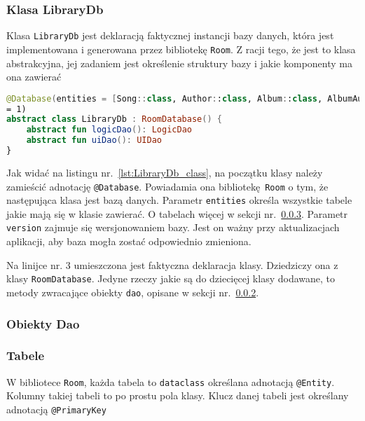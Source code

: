 \subsubsection{Klasa LibraryDb} \label{sec:LibraryDb}

Klasa \texttt{LibraryDb} jest deklaracją faktycznej instancji bazy danych, która jest implementowana i generowana przez bibliotekę \texttt{Room}. Z racji tego, że jest to klasa abstrakcyjna, jej zadaniem jest określenie struktury bazy i jakie komponenty ma ona zawierać

\begin{lstlisting}[caption=Deklaracja bazy LibraryDb, label={lst:LibraryDb_class}, language=kotlin]
@Database(entities = [Song::class, Author::class, Album::class, AlbumAuthorCrossRef::class], version
= 1)
abstract class LibraryDb : RoomDatabase() {
    abstract fun logicDao(): LogicDao
    abstract fun uiDao(): UIDao
}

\end{lstlisting}

Jak widać na listingu nr.~\ref{lst:LibraryDb_class}, na początku klasy należy zamieścić adnotację \texttt{@Database}. Powiadamia ona bibliotekę \texttt{Room} o tym, że następująca klasa jest bazą danych. Parametr \texttt{entities} określa wszystkie tabele jakie mają się w klasie zawierać. O tabelach więcej w sekcji nr.~\ref{sec:tables}. Parametr \texttt{version} zajmuje się wersjonowaniem bazy. Jest on ważny przy aktualizacjach aplikacji, aby baza mogła zostać odpowiednio zmieniona. 

Na linijce nr. 3 umieszczona jest faktyczna deklaracja klasy. Dziedziczy ona z klasy \texttt{RoomDatabase}. Jedyne rzeczy jakie są do dziecięcej klasy dodawane, to metody zwracające obiekty \texttt{dao}, opisane w sekcji nr.~\ref{sec:daos}.

\subsubsection{Obiekty Dao} \label{sec:daos}

\subsubsection{Tabele} \label{sec:tables}

W bibliotece \texttt{Room}, każda tabela to \texttt{dataclass} określana adnotacją \texttt{@Entity}. Kolumny takiej tabeli to po prostu pola klasy. Klucz danej tabeli jest określany adnotacją \texttt{@PrimaryKey}


